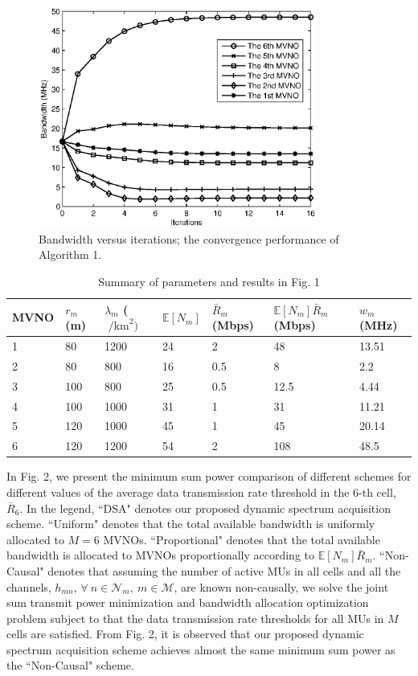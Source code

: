 \documentclass[journal]{IEEEtran}
\begin{document}
\begin{figure}
\centering
\includegraphics[width=3.6in]{fig1.eps}
\caption{Bandwidth versus iterations; the convergence performance of Algorithm 1.}
\end{figure}

{ 
\begin{table}[!ht]
	\color{red}
	\caption{Summary of parameters and results in Fig. 1}
	\centering
\begin{tabular}{|p{}|p{}|p{}|p{}|p{}|p{}|p{}|} %
	\hline 
	 MVNO&$ r_m $ (m) & $ \lambda_m $ ($\mbox{ /km}^2) $&  $\mathbb{E}[N_m]$	&  	$ \bar{R}_m $ (Mbps)&  $\mathbb{E}[N_m]\bar{R}_m $ (Mbps)& $ w_m $ (MHz) \\ 
	\hline 
	\hline
1&	80&  1200&  24&  2&  48&  13.51\\ 
	\hline 
2&	80&  800&  16&  0.5&  8&  2.2\\ 
	\hline 
3&	100&  800&  25&  0.5&  12.5&  4.44\\ 
	\hline 
4&	100&  1000&  31&  1&  31&  11.21\\ 
	\hline 
5&	120&  1000&  45&  1&  45&  20.14\\ 
	\hline 
6&	120&  1200&  54&  2&  108&  48.5\\ 
	\hline 
\end{tabular} 

	\label{t1}
\end{table}
}
In Fig. 2, we present the minimum sum power comparison of different schemes for different values of the average data transmission rate threshold in the 6-th cell, $\bar{R}_6$. In the legend, ``DSA" denotes our proposed dynamic spectrum acquisition scheme. ``Uniform" denotes that the total available bandwidth is uniformly allocated to $M=6$ MVNOs. ``Proportional" denotes that the total available bandwidth is allocated to MVNOs proportionally according to $\mathbb{E}[N_m]\bar{R}_m$. ``Non-Causal" denotes that assuming the number of active MUs in all cells and all the channels, $h_{mn}$, $\forall\ n\in\mathcal{N}_m,\ m\in\mathcal{M}$, are known non-causally, we solve the joint sum transmit power minimization and bandwidth allocation optimization problem subject to that the data transmission rate thresholds for all MUs in $M$ cells are satisfied. From Fig. 2, it is observed that our proposed dynamic spectrum acquisition scheme achieves almost the same minimum sum power as the ``Non-Causal" scheme.
\end{document}
